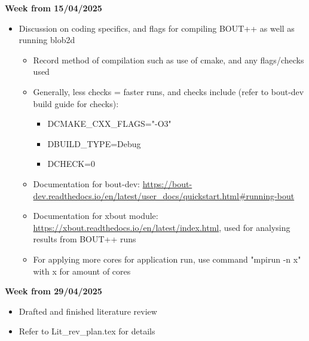 \documentclass{article}
\begin{document}
\begin{arrowlist}
    \item \textbf{Week from 15/04/2025}
    \begin{itemize}
        \item Discussion on coding specifics, and flags for compiling BOUT++ as well as running blob2d
        \begin{itemize}
            \item Record method of compilation such as use of cmake, and any flags/checks used
            \item Generally, less checks = faster runs, and checks include (refer to bout-dev build guide for checks):
            \begin{itemize}
                \item DCMAKE\_CXX\_FLAGS="-O3"
                \item DBUILD\_TYPE=Debug
                \item DCHECK=0
            \end{itemize}
            \item Documentation for bout-dev: \url{https://bout-dev.readthedocs.io/en/latest/user_docs/quickstart.html#running-bout}
            \item Documentation for xbout module: \url{https://xbout.readthedocs.io/en/latest/index.html}, used for analysing results from BOUT++ runs
            \item For applying more cores for application run, use command "mpirun -n x" with x for amount of cores
        \end{itemize}
    \end{itemize}
    
    \item \textbf{Week from 29/04/2025}
       \begin{itemize}
            \item Drafted and finished literature review
            \item Refer to Lit\_rev\_plan.tex for details
       \end{itemize}
\end{arrowlist}
\end{document}
